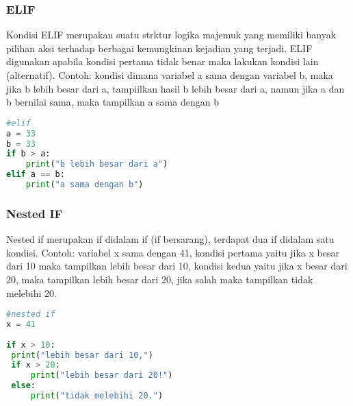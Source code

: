 \subsubsection{ELIF}
Kondisi ELIF merupakan suatu strktur logika majemuk yang memiliki banyak pilihan aksi terhadap berbagai kemungkinan kejadian yang terjadi. ELIF digunakan apabila kondisi pertama tidak benar maka lakukan kondisi lain (alternatif). Contoh: kondisi dimana variabel a sama dengan variabel b, maka jika b lebih besar dari a, tampiilkan hasil b lebih besar dari a, namun jika a dan b bernilai sama, maka tampilkan a sama dengan b
\begin{lstlisting}[language=Python]
#elif 
a = 33 
b = 33 
if b > a: 
 	print("b lebih besar dari a") 
elif a == b: 
 	print("a sama dengan b")
\end{lstlisting}

\subsubsection{Nested IF}
Nested if merupakan if didalam if (if bersarang), terdapat dua if didalam satu kondisi. Contoh: variabel x sama dengan 41, kondisi pertama yaitu jika x besar dari 10 maka tampilkan lebih besar dari 10, kondisi kedua yaitu jika x besar dari 20, maka tampilkan lebih besar dari 20, jika salah maka tampilkan tidak melebihi 20.
\begin{lstlisting}[language=Python]
#nested if 
x = 41
 
if x > 10: 
 print("lebih besar dari 10,") 
 if x > 20: 
	 print("lebih besar dari 20!") 
 else: 
	 print("tidak melebihi 20.")
\end{lstlisting}

